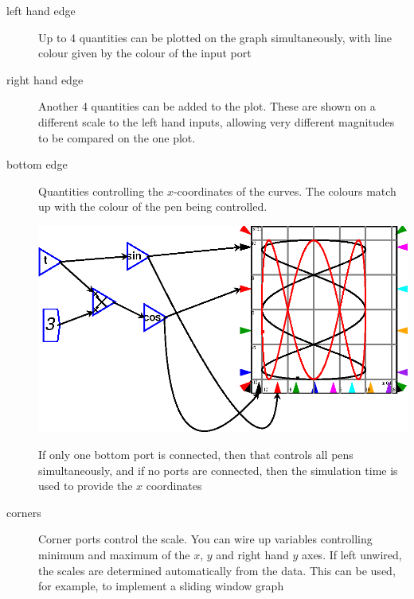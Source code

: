 \begin{description}
\item[left hand edge] Up to 4 quantities can be plotted on the graph
  simultaneously, with line colour given by the colour of the input
  port
\item[right hand edge] Another 4 quantities can be added to the
  plot. These are shown on a different scale to the left hand inputs,
  allowing very different magnitudes to be compared on the one plot.
\item[bottom edge] Quantities controlling the $x$-coordinates of the
  curves. The colours match up with the colour of the pen being
  controlled.

\begin{center}
  \includegraphics{images/plotLissajous.eps}
\end{center}

If only one bottom port is connected, then that controls all pens
simultaneously, and if no ports are connected, then the simulation
time is used to provide the $x$ coordinates
\item[corners] Corner ports control the scale. You can wire up
  variables controlling minimum and maximum of the $x$, $y$ and right
  hand $y$ axes. If left unwired, the scales are determined
  automatically from the data. This can be used, for example, to
  implement a sliding window graph


\end{description}
